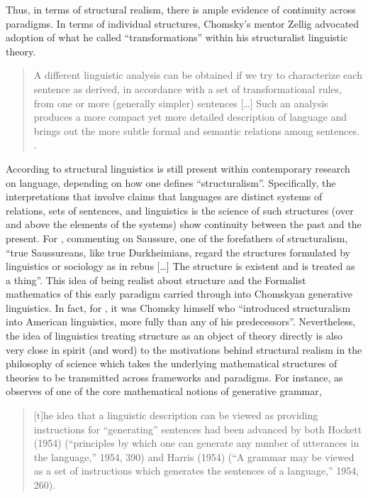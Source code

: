 \documentclass[output=paper]{langscibook}
\begin{document}
Thus, in terms of structural realism, there is ample evidence of continuity across paradigms. In terms of individual structures, Chomsky's mentor Zellig \cite{Harris1951} advocated adoption of what he called ``transformations'' within his structuralist linguistic theory. 

\begin{quote}
    A different linguistic analysis can be obtained if we try to characterize each sentence as derived, in accordance with a set of transformational rules, from one or more (generally simpler) sentences […] Such an analysis produces a more compact yet more detailed description of language and brings out the more subtle formal and semantic relations among sentences. \citep[iv]{Harris1951}.
\end{quote}

According to \cite{Matthews2001} structural linguistics is still present within contemporary research on language, depending on how one defines ``structuralism''. Specifically, the interpretations that involve claims that languages are distinct systems of relations, sets of sentences, and linguistics is the science of such structures (over and above the elements of the systems) show continuity between the past and the present. For \cite[181]{Firth1957}, commenting on Saussure, one of the forefathers of structuralism,  ``true Saussureans, like true Durkheimians, regard the structures formulated by linguistics or sociology as in rebus […] The structure is existent and is treated as a thing''. This idea of being realist about structure and the Formalist mathematics of this early paradigm carried through into Chomskyan generative linguistics. In fact, for \cite[26]{Joseph1999}, it was Chomsky himself who ``introduced structuralism into American linguistics, more fully than any of his predecessors''. Nevertheless, the idea of linguistics treating structure as an object of theory directly is also very close in spirit (and word) to the motivations behind structural realism in the philosophy of science which takes the underlying mathematical structures of theories to be transmitted across frameworks and paradigms. For instance, as \cite{Pullum2019} observes of one of the core mathematical notions of generative grammar, 

\begin{quote}
    [t]he idea that a linguistic description can be viewed as providing instructions for ``generating'' sentences had been advanced by both Hockett (1954) (``principles by which one can generate any number of utterances in the language,'' 1954, 390) and Harris (1954) (``A grammar may be viewed as a set of instructions which generates the sentences of a language,'' 1954, 260). \citep{Pullum2019}
\end{quote}
\end{document}
